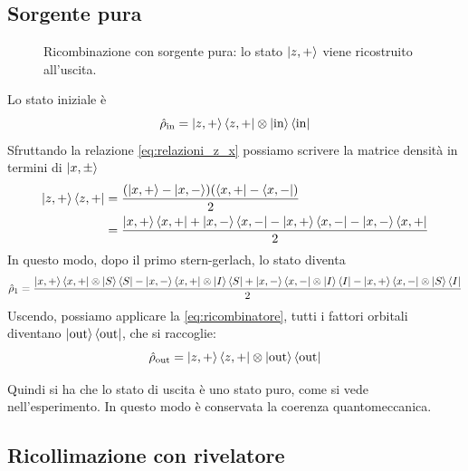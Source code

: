 \subsection*{Sorgente pura}

\begin{figure}[htbp]
\centering
{}
\caption{Ricombinazione con sorgente pura: lo stato $\ket{z,+}$ viene
ricostruito all'uscita.}
\label{fig:ricomb-puro}
\end{figure}

Lo stato iniziale è 
\begin{equation}
    \hat{\rho}_{\text{in}} = \ket{z, +}\bra{z, +} \otimes \ket{\text{in}}\bra{\text{in}}
\end{equation}
Sfruttando la relazione \eqref{eq:relazioni_z_x} possiamo scrivere la matrice densità in termini di $\ket{x, \pm}$
\begin{align*}
    \ket{z, +}\bra{z,+} &= \frac{(\ket{x, +} - \ket{x, -})(\bra{x, +} - \bra{x, -})}{2}\\
    &= \frac{\ket{x,+}\bra{x,+} + \ket{x,-}\bra{x, -} - \ket{x, +}\bra{x, -} - \ket{x, -}\bra{x, +}}{2}
\end{align*}
In questo modo, dopo il primo stern-gerlach, lo stato diventa
\begin{align*}
    \hat{\rho}_1 = \frac{\ket{x, +}\bra{x, +} \otimes \ket{S}\bra{S} - \ket{x,-}\bra{x, +} \otimes \ket{I}\bra{S} + \ket{x, -}\bra{x, -} \otimes \ket{I}\bra{I} - \ket{x,+}\bra{x, -} \otimes \ket{S}\bra{I}}{2}
\end{align*}
Uscendo, possiamo applicare la \eqref{eq:ricombinatore}, tutti i fattori orbitali diventano $\ket{\text{out}}\bra{\text{out}}$, che si raccoglie:
%
\begin{equation}
    \hat{\rho}_{\text{out}} = \ket{z, +}\bra{z, +} \otimes \ket{\text{out}}\bra{\text{out}}
\end{equation}

Quindi si ha che lo stato di uscita è uno stato puro, come si vede nell'esperimento. In questo modo è conservata la coerenza quantomeccanica. 

\subsection{Ricollimazione con rivelatore}

